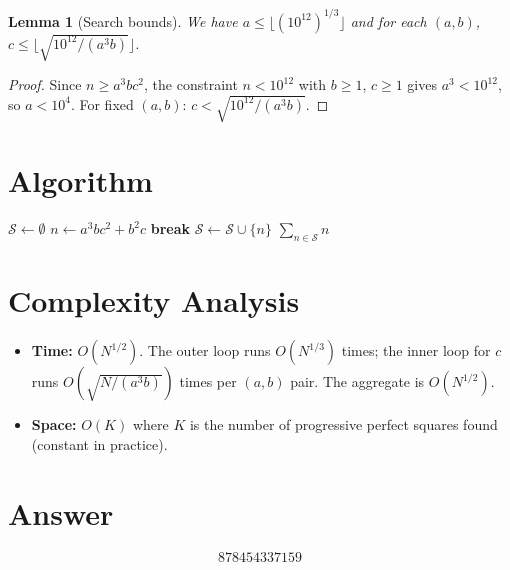 \documentclass[12pt]{article}
\newtheorem{lemma}[theorem]{Lemma}
\begin{document}
\begin{lemma}[Search bounds]
We have $a \leq \lfloor (10^{12})^{1/3} \rfloor$ and for each $(a,b)$, $c \leq \lfloor \sqrt{10^{12}/(a^3 b)} \rfloor$.
\end{lemma}

\begin{proof}
Since $n \geq a^3 bc^2$, the constraint $n < 10^{12}$ with $b \geq 1$, $c \geq 1$ gives $a^3 < 10^{12}$, so $a < 10^4$. For fixed $(a,b)$: $c < \sqrt{10^{12}/(a^3 b)}$.
\end{proof}

\section{Algorithm}

\begin{algorithmic}[1]
\State $\mathcal{S} \gets \emptyset$
            \State $n \gets a^3 b c^2 + b^2 c$
             \textbf{break} \EndIf
             $\mathcal{S} \gets \mathcal{S} \cup \{n\}$ \EndIf
        \EndFor
    \EndFor
\EndFor
\State \Return $\sum_{n \in \mathcal{S}} n$
\end{algorithmic}

\section{Complexity Analysis}

\begin{itemize}
\item \textbf{Time:} $O(N^{1/2})$. The outer loop runs $O(N^{1/3})$ times; the inner loop for $c$ runs $O(\sqrt{N/(a^3 b)})$ times per $(a,b)$ pair. The aggregate is $O(N^{1/2})$.
\item \textbf{Space:} $O(K)$ where $K$ is the number of progressive perfect squares found (constant in practice).
\end{itemize}

\section{Answer}

\[
\boxed{878454337159}
\]
\end{document}
